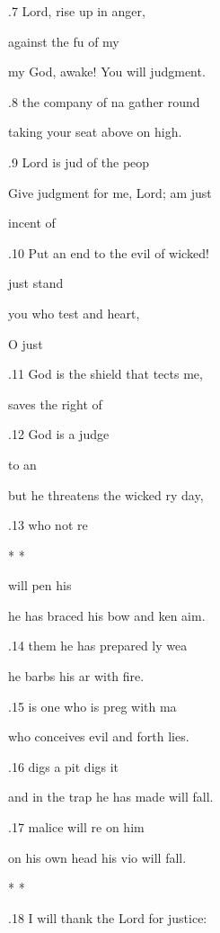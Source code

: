 .7 Lord, rise up in  anger, 

 against the fu of my  

my God, awake! You will  judgment. 

.8  the company of na gather round  

taking your seat above  on high. 

.9  Lord is jud of the peop 

Give judgment for me, Lord;  am just 

 incent of  

.10 Put an end to the evil of  wicked! 

  just stand  

you who test  and heart, 

  O just  

.11 God is the shield that tects me, 

 saves the right of  

.12 God is a  judge 

  to an 

but he threatens the wicked ry day, 

.13  who  not re 

\pl{*} * * 

 will pen his  

he has braced his bow and ken aim. 

.14  them he has prepared ly wea 

he barbs his ar with fire. 

.15  is one who is preg with ma 

who conceives evil and  forth lies. 

.16  digs a pit digs it  

and in the trap he has made  will fall. 

.17  malice will re on him 

on his own head his vio will fall. 

\mi{*} \pl{* * *} * * \pl{*} 

.18 I will thank the Lord for  justice: 

